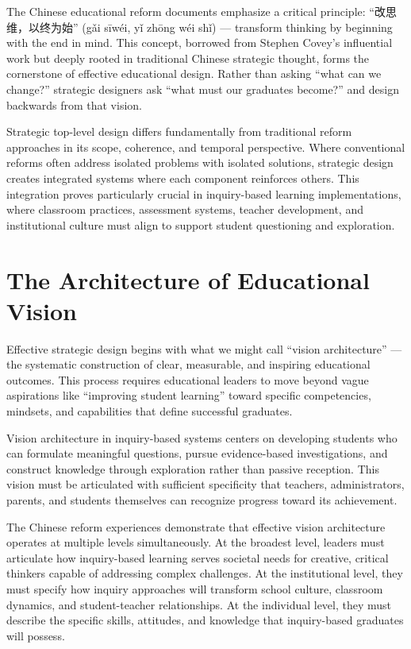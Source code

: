 \documentclass[
  Letterpaper,
]{scrbook}
\begin{document}
The Chinese educational reform documents emphasize a critical principle:
``改思维，以终为始'' (gǎi sīwéi, yǐ zhōng wéi shǐ) --- transform
thinking by beginning with the end in mind. This concept, borrowed from
Stephen Covey's influential work but deeply rooted in traditional
Chinese strategic thought, forms the cornerstone of effective
educational design. Rather than asking ``what can we change?'' strategic
designers ask ``what must our graduates become?'' and design backwards
from that vision.

Strategic top-level design differs fundamentally from traditional reform
approaches in its scope, coherence, and temporal perspective. Where
conventional reforms often address isolated problems with isolated
solutions, strategic design creates integrated systems where each
component reinforces others. This integration proves particularly
crucial in inquiry-based learning implementations, where classroom
practices, assessment systems, teacher development, and institutional
culture must align to support student questioning and exploration.

\section{The Architecture of Educational
Vision}\label{the-architecture-of-educational-vision}

Effective strategic design begins with what we might call ``vision
architecture'' --- the systematic construction of clear, measurable, and
inspiring educational outcomes. This process requires educational
leaders to move beyond vague aspirations like ``improving student
learning'' toward specific competencies, mindsets, and capabilities that
define successful graduates.

Vision architecture in inquiry-based systems centers on developing
students who can formulate meaningful questions, pursue evidence-based
investigations, and construct knowledge through exploration rather than
passive reception. This vision must be articulated with sufficient
specificity that teachers, administrators, parents, and students
themselves can recognize progress toward its achievement.

The Chinese reform experiences demonstrate that effective vision
architecture operates at multiple levels simultaneously. At the broadest
level, leaders must articulate how inquiry-based learning serves
societal needs for creative, critical thinkers capable of addressing
complex challenges. At the institutional level, they must specify how
inquiry approaches will transform school culture, classroom dynamics,
and student-teacher relationships. At the individual level, they must
describe the specific skills, attitudes, and knowledge that
inquiry-based graduates will possess.
\end{document}
